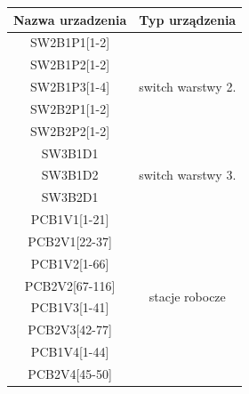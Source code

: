 \documentclass[a4paper, 12pt]{article}
\begin{document}

\newpage

\begin{table}[H]
\centering
\begin{tabular}{|c|c|}
\hline
\textbf{Nazwa urzadzenia} & \textbf{Typ urządzenia}                                      \\ \hline
SW2B1P1{[}1-2{]}          & \multirow{5}{*}{switch warstwy 2.}                           \\ \cline{1-1}
SW2B1P2{[}1-2{]}          &                                                              \\ \cline{1-1}
SW2B1P3{[}1-4{]}          &                                                              \\ \cline{1-1}
SW2B2P1{[}1-2{]}          &                                                              \\ \cline{1-1}
SW2B2P2{[}1-2{]}          &                                                              \\ \hline
SW3B1D1                   & \multirow{3}{*}{switch warstwy 3.}                           \\ \cline{1-1}
SW3B1D2                   &                                                              \\ \cline{1-1}
SW3B2D1                   &                                                              \\ \hline
PCB1V1{[}1-21{]}          & \multirow{10}{*}{stacje robocze}                             \\ \cline{1-1}
PCB2V1{[}22-37{]}         &                                                              \\ \cline{1-1}
PCB1V2{[}1-66{]}          &                                                              \\ \cline{1-1}
PCB2V2{[}67-116{]}        &                                                              \\ \cline{1-1}
PCB1V3{[}1-41{]}          &                                                              \\ \cline{1-1}
PCB2V3{[}42-77{]}         &                                                              \\ \cline{1-1}
PCB1V4{[}1-44{]}          &                                                              \\ \cline{1-1}
PCB2V4{[}45-50{]}         &                                                              \\ \cline{1-1}

\end{tabular}
\end{table}
\end{document}
